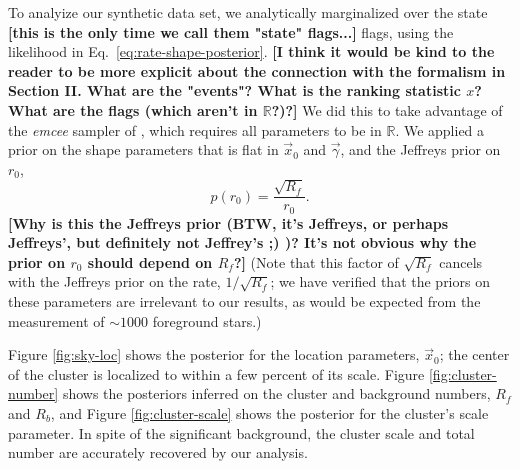 \documentclass[aps,prd]{revtex4-1}
\newcommand{\ilya}[1]{{\color{red} \bf #1}}
\begin{document}
To analyize our synthetic data set, we analytically marginalized over
the state \ilya{[this is the only time we call them "state" flags...]}
flags, using the likelihood in Eq.~\eqref{eq:rate-shape-posterior}.
\ilya{[I think it would be kind to the reader to be more explicit
    about the connection with the formalism in Section II.  What are
    the "events"?  What is the ranking statistic $x$?  What are the
    flags (which aren't in $\mathbb{R}$?)?]}  We did this to take
advantage of the \textit{emcee} sampler of \citet{ForemanMackey2012},
which requires all parameters to be in $\mathbb{R}$.  We applied a
prior on the shape parameters that is flat in $\vec{x}_0$ and
$\vec{\gamma}$, and the Jeffreys prior on $r_0$,
\begin{equation}
  p\left( r_0 \right) = \frac{\sqrt{R_f}}{r_0}.
\end{equation}
\ilya{[Why is this the Jeffreys prior (BTW, it's Jeffreys, or perhaps
    Jeffreys', but definitely not Jeffrey's ;) )?  It's not obvious
    why the prior on $r_0$ should depend on $R_f$?]}  (Note that this
factor of $\sqrt{R_f}$ cancels with the Jeffreys prior on the rate,
$1/\sqrt{R_f}$; we have verified that the priors on these parameters
are irrelevant to our results, as would be expected from the
measurement of $\sim 1000$ foreground stars.)

Figure \ref{fig:sky-loc} shows the posterior for the location
parameters, $\vec{x}_0$; the center of the cluster is localized to
within a few percent of its scale.  Figure \ref{fig:cluster-number}
shows the posteriors inferred on the cluster and background numbers,
$R_f$ and $R_b$, and Figure \ref{fig:cluster-scale} shows the
posterior for the cluster's scale parameter.  In spite of the
significant background, the cluster scale and total number are
accurately recovered by our analysis.
\end{document}
